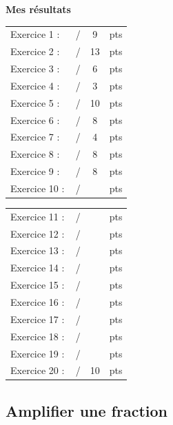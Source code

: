 \vfill
\begin{center}
{\Large\bfseries\color{themeNO!65!black} Mes résultats}
\end{center}

\vspace{3mm}
\renewcommand{\arraystretch}{1.8}
\begin{tabularx}{0.42\textwidth}{lXcl}
Exercice 1 : & \dotfill\,/ &9 &pts\\
Exercice 2 : & \dotfill\,/ &13 &pts\\
Exercice 3 : & \dotfill\,/ &6 &pts\\
Exercice 4 : & \dotfill\,/ &3 &pts\\
Exercice 5 : & \dotfill\,/ &10 &pts\\
Exercice 6 : & \dotfill\,/ &8 &pts\\
Exercice 7 : & \dotfill\,/ &4 &pts\\
Exercice 8 : & \dotfill\,/ &8 &pts\\
Exercice 9 : & \dotfill\,/ &8 &pts\\
Exercice 10 : & \dotfill\,/ & &pts\\
\end{tabularx}
\hfill
\begin{tabularx}{0.42\textwidth}{lXcl}
Exercice 11 : & \dotfill\,/ & &pts\\
Exercice 12 : & \dotfill\,/ & &pts\\
Exercice 13 : & \dotfill\,/ & &pts\\
Exercice 14 : & \dotfill\,/ & &pts\\
Exercice 15 : & \dotfill\,/ & &pts\\
Exercice 16 : & \dotfill\,/ & &pts\\
Exercice 17 : & \dotfill\,/ & &pts\\
Exercice 18 : & \dotfill\,/ & &pts\\
Exercice 19 : & \dotfill\,/ & &pts\\
Exercice 20 : & \dotfill\,/ & 10&pts\\
\end{tabularx}
\renewcommand{\arraystretch}{1.7}
\clearpage



\setcounter{section}{1}
\subsection{Amplifier une fraction}\label{sec:AmplifierFraction}


